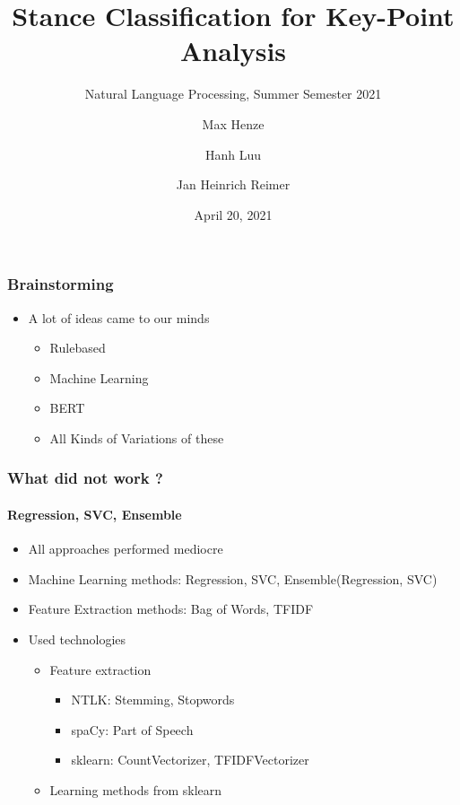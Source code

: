 \documentclass[english,handout]{mlutalk}
\title{Stance Classification for Key-Point Analysis}
\subtitle{Natural Language Processing, Summer Semester 2021}
\author{Max Henze \and Hanh Luu \and Jan Heinrich Reimer}
\institute{Martin Luther University Halle-Wittenberg}
\date{April 20, 2021}
\begin{document}
\titleframe

\begin{frame}
  \frametitle{Brainstorming}

  \begin{itemize}
    \item A lot of ideas came to our minds
    \begin{itemize}
      \item Rulebased
      \item Machine Learning
      \item BERT
      \item All Kinds of Variations of these
    \end{itemize}   
  \end{itemize}

\end{frame}

\begin{frame}
  \frametitle{What did not work ?}
  \framesubtitle{Regression, SVC, Ensemble}
    \begin{itemize}
      \item All approaches performed mediocre
      \item Machine Learning methods: Regression, SVC, Ensemble(Regression, SVC)
      \item Feature Extraction methods: Bag of Words, TFIDF
      \item Used technologies
      		\begin{itemize}
    		\item Feature extraction
    		\begin{itemize}
    			\item NTLK: Stemming, Stopwords
    			\item spaCy: Part of Speech
    			\item sklearn: CountVectorizer, TFIDFVectorizer
    		\end{itemize}
    		\item Learning methods from sklearn
    	\end{itemize}
    \end{itemize}
  

\end{frame}
\end{document}
